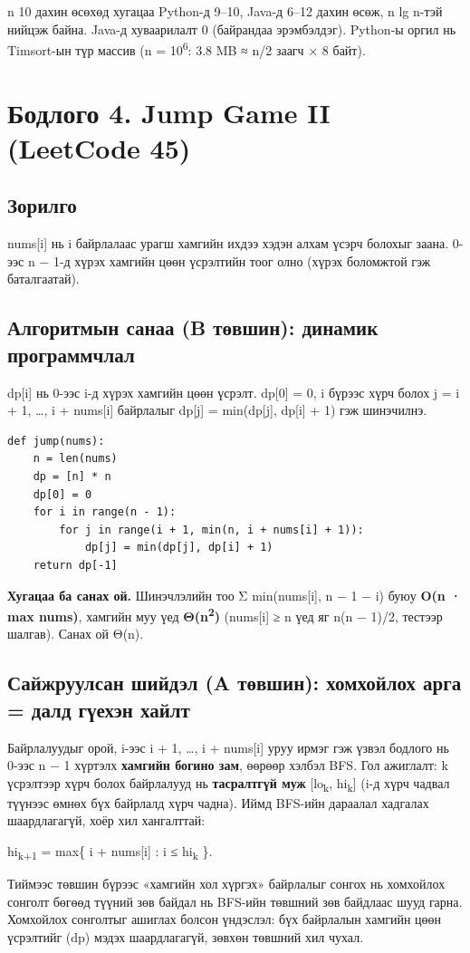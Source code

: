\documentclass[11pt,a4paper]{article}
\renewcommand{\_}{\oldunderscore\allowbreak}
\begin{document}
n 10 дахин өсөхөд хугацаа Python-д 9–10, Java-д 6–12 дахин өсөж, n lg n-тэй нийцэж байна. Java-д хуваарилалт 0 (байрандаа эрэмбэлдэг). Python-ы оргил нь Timsort-ын түр массив (n = 10\textsuperscript{6}: 3.8 MB ≈ n/2 заагч × 8 байт).

\section{Бодлого 4. Jump Game II (LeetCode 45)}

\subsection{Зорилго}
nums[i] нь i байрлалаас урагш хамгийн ихдээ хэдэн алхам үсэрч болохыг заана. 0-ээс n − 1-д хүрэх хамгийн цөөн үсрэлтийн тоог олно (хүрэх боломжтой гэж баталгаатай).

\subsection{Алгоритмын санаа (B төвшин): динамик программчлал}
dp[i] нь 0-ээс i-д хүрэх хамгийн цөөн үсрэлт. dp[0] = 0, i бүрээс хүрч болох j = i + 1, …, i + nums[i] байрлалыг dp[j] = min(dp[j], dp[i] + 1) гэж шинэчилнэ.

\begin{Verbatim}
def jump(nums):
    n = len(nums)
    dp = [n] * n
    dp[0] = 0
    for i in range(n - 1):
        for j in range(i + 1, min(n, i + nums[i] + 1)):
            dp[j] = min(dp[j], dp[i] + 1)
    return dp[-1]
\end{Verbatim}

\textbf{Хугацаа ба санах ой.} Шинэчлэлийн тоо Σ min(nums[i], n − 1 − i) буюу \textbf{O(n · max nums)}, хамгийн муу үед \textbf{Θ(n\textsuperscript{2})} (nums[i] ≥ n үед яг n(n − 1)/2, тестээр шалгав). Санах ой Θ(n).

\subsection{Сайжруулсан шийдэл (A төвшин): хомхойлох арга = далд гүехэн хайлт}
Байрлалуудыг орой, i-ээс i + 1, …, i + nums[i] уруу ирмэг гэж үзвэл бодлого нь 0-ээс n − 1 хүртэлх \textbf{хамгийн богино зам}, өөрөөр хэлбэл BFS. Гол ажиглалт: k үсрэлтээр хүрч болох байрлалууд нь \textbf{тасралтгүй муж} [lo\textsubscript{k}, hi\textsubscript{k}] (i-д хүрч чадвал түүнээс өмнөх бүх байрлалд хүрч чадна). Иймд BFS-ийн дараалал хадгалах шаардлагагүй, хоёр хил хангалттай:
\begin{center}
hi\textsubscript{k+1} = max\{ i + nums[i] : i ≤ hi\textsubscript{k} \}.
\end{center}
Тиймээс төвшин бүрээс «хамгийн хол хүргэх» байрлалыг сонгох нь хомхойлох сонголт бөгөөд түүний зөв байдал нь BFS-ийн төвшний зөв байдлаас шууд гарна. Хомхойлох сонголтыг ашиглах болсон үндэслэл: бүх байрлалын хамгийн цөөн үсрэлтийг (dp) мэдэх шаардлагагүй, зөвхөн төвшний хил чухал.
\end{document}
